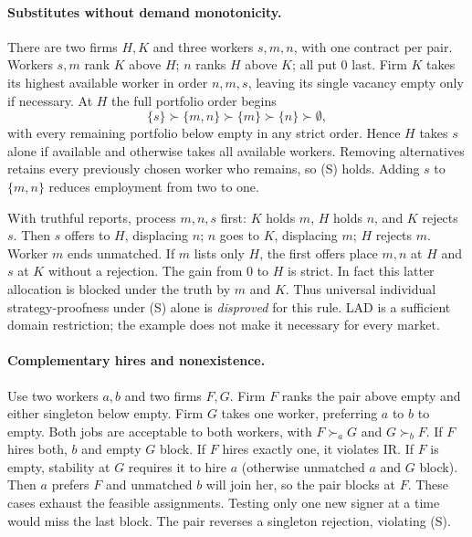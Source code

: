 \documentclass[11pt]{article}
\begin{document}
\paragraph{Substitutes without demand monotonicity.}
There are two firms $H,K$ and three workers $s,m,n$, with one contract per pair. Workers $s,m$ rank $K$ above $H$; $n$ ranks $H$ above $K$; all put $0$ last. Firm $K$ takes its highest available worker in order $n,m,s$, leaving its single vacancy empty only if necessary. At $H$ the full portfolio order begins
\[
 \{s\}\succ\{m,n\}\succ\{m\}\succ\{n\}\succ\emptyset ,
\]
with every remaining portfolio below empty in any strict order. Hence $H$ takes $s$ alone if available and otherwise takes all available workers. Removing alternatives retains every previously chosen worker who remains, so (S) holds. Adding $s$ to $\{m,n\}$ reduces employment from two to one.

With truthful reports, process $m,n,s$ first: $K$ holds $m$, $H$ holds $n$, and $K$ rejects $s$. Then $s$ offers to $H$, displacing $n$; $n$ goes to $K$, displacing $m$; $H$ rejects $m$. Worker $m$ ends unmatched. If $m$ lists only $H$, the first offers place $m,n$ at $H$ and $s$ at $K$ without a rejection. The gain from $0$ to $H$ is strict. In fact this latter allocation is blocked under the truth by $m$ and $K$. Thus universal individual strategy-proofness under (S) alone is \emph{disproved} for this rule. LAD is a sufficient domain restriction; the example does not make it necessary for every market.

\paragraph{Complementary hires and nonexistence.}
Use two workers $a,b$ and two firms $F,G$. Firm $F$ ranks the pair above empty and either singleton below empty. Firm $G$ takes one worker, preferring $a$ to $b$ to empty. Both jobs are acceptable to both workers, with $F\succ_a G$ and $G\succ_b F$. If $F$ hires both, $b$ and empty $G$ block. If $F$ hires exactly one, it violates IR. If $F$ is empty, stability at $G$ requires it to hire $a$ (otherwise unmatched $a$ and $G$ block). Then $a$ prefers $F$ and unmatched $b$ will join her, so the pair blocks at $F$. These cases exhaust the feasible assignments. Testing only one new signer at a time would miss the last block. The pair reverses a singleton rejection, violating (S).
\end{document}

